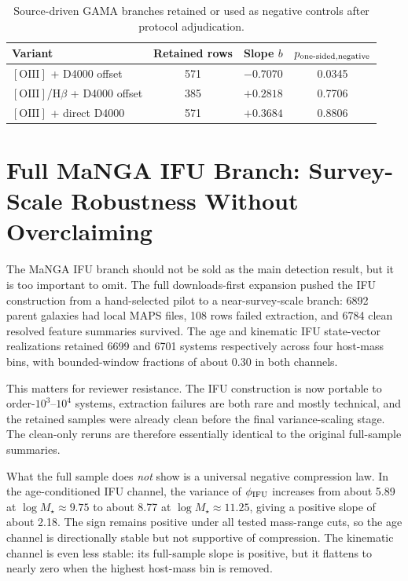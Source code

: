 \documentclass[11pt]{article}
\begin{document}
\begin{table}[H]
\centering
\caption{Source-driven GAMA branches retained or used as negative controls after protocol adjudication.}
\label{tab:gama_dual_branch}
\begin{tabular}{p{5.1cm}ccc}
\toprule
Variant & Retained rows & Slope $b$ & $p_{\rm one\text{-}sided,negative}$ \\
\midrule
$[\mathrm{OIII}]$ + D4000 offset & 571 & $-0.7070$ & 0.0345 \\

$[\mathrm{OIII}]$/H$\beta$ + D4000 offset & 385 & $+0.2818$ & 0.7706 \\
$[\mathrm{OIII}]$ + direct D4000 & 571 & $+0.3684$ & 0.8806 \\
\bottomrule
\end{tabular}
\end{table}

\section{Full MaNGA IFU Branch: Survey-Scale Robustness Without Overclaiming}

The MaNGA IFU branch should not be sold as the main detection result, but it is too important to omit. The full downloads-first expansion pushed the IFU construction from a hand-selected pilot to a near-survey-scale branch: 6892 parent galaxies had local MAPS files, 108 rows failed extraction, and 6784 clean resolved feature summaries survived. The age and kinematic IFU state-vector realizations retained 6699 and 6701 systems respectively across four host-mass bins, with bounded-window fractions of about 0.30 in both channels.

This matters for reviewer resistance. The IFU construction is now portable to order-$10^3$--$10^4$ systems, extraction failures are both rare and mostly technical, and the retained samples were already clean before the final variance-scaling stage. The clean-only reruns are therefore essentially identical to the original full-sample summaries.

What the full sample does \emph{not} show is a universal negative compression law. In the age-conditioned IFU channel, the variance of $\phi_{\rm IFU}$ increases from about 5.89 at $\log M_\star\approx 9.75$ to about 8.77 at $\log M_\star\approx 11.25$, giving a positive slope of about 2.18. The sign remains positive under all tested mass-range cuts, so the age channel is directionally stable but not supportive of compression. The kinematic channel is even less stable: its full-sample slope is positive, but it flattens to nearly zero when the highest host-mass bin is removed.
\end{document}
